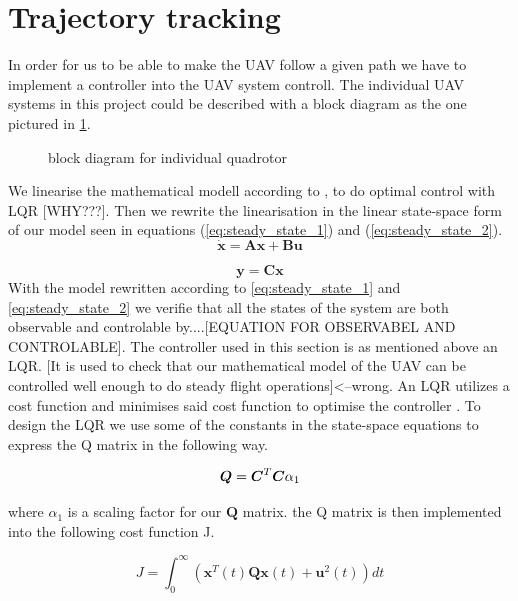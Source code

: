 \documentclass[journal]{IEEEtran}
\begin{document}
	\section{Trajectory tracking}
	In order for us to be able to make the UAV follow a given path we have to implement a controller into the UAV system controll. The individual UAV systems in this project could be described with a block diagram as the one pictured in \figurename{\ref{fig:block_diagram}}.
	\begin{figure}[h]
		\centering
		
		\caption{block diagram for individual quadrotor}
		\label{fig:block_diagram}
	\end{figure}	
	We linearise the mathematical modell according to \cite{SabatinoFrancesco2015Qcmn}, to do optimal control with LQR [WHY???]. Then we rewrite the linearisation in the linear state-space form \cite{SabatinoFrancesco2015Qcmn} of our model seen in equations (\ref{eq:steady_state_1}) and (\ref{eq:steady_state_2}).
	\begin{equation} \label{eq:steady_state_1}
			\bm{\dot x} = \bm{A} \bm{x} + \bm{B} \bm{u}
	\end{equation}
	
	\begin{equation} \label{eq:steady_state_2}
	\bm{y} = \bm{C} \bm{x}
	\end{equation}
	With the model rewritten according to \ref{eq:steady_state_1} and \ref{eq:steady_state_2} we verifie that all the states of the system are both observable and controlable by....[EQUATION FOR OBSERVABEL AND CONTROLABLE]. The controller used in this section is as mentioned above an LQR. [It is used to check that our mathematical model of the UAV can be controlled well enough to do steady flight operations]<--wrong.  An LQR utilizes a cost function and minimises said cost function to optimise the controller \cite{bokLQ}. To design the LQR we use some of the constants in the state-space equations to express the Q matrix in the following way.
	
	\begin{equation}
	\bm{Q}=\bm{C^}{T}\bm{C}\alpha_{1}
	\end{equation}
	
	where $\alpha_{1}$ is a scaling factor for our $\bm{Q}$ matrix.
	the Q matrix is then implemented into the following cost function J.
	
	\begin{equation}
	J = \int_{0}^{\infty} (\bm{x}^{T}(t)\bm{Q}\bm{x}(t)+\bm{u}^2(t)) dt
	\end{equation}
	
\end{document}

